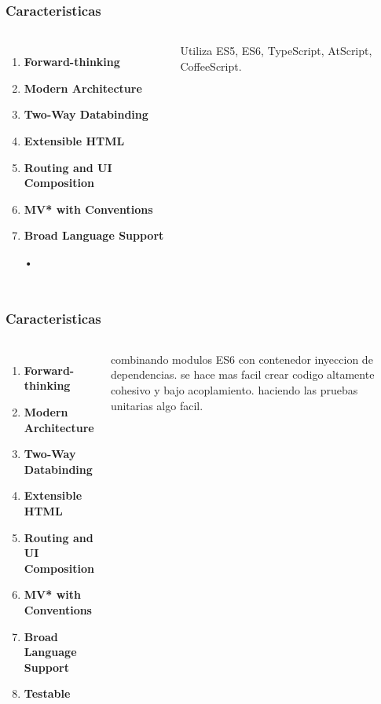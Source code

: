 \documentclass{beamer}
\begin{document}

\begin{frame}
\frametitle{Caracteristicas}
\begin{columns}[c] %

\begin{enumerate}
\item \textbf{Forward-thinking}
\item \textbf{Modern Architecture}
\item \textbf{Two-Way Databinding}
\item \textbf{Extensible HTML}
\item \textbf{Routing and UI Composition}
\item \textbf{MV* with Conventions}
\item \textbf{Broad Language Support}
\item[•]	
\end{enumerate}

Utiliza ES5, ES6, TypeScript, AtScript, CoffeeScript.
\end{columns}
\end{frame}


\begin{frame}
\frametitle{Caracteristicas}
\begin{columns}[c] %

\begin{enumerate}
\item \textbf{Forward-thinking}
\item \textbf{Modern Architecture}
\item \textbf{Two-Way Databinding}
\item \textbf{Extensible HTML}
\item \textbf{Routing and UI Composition}
\item \textbf{MV* with Conventions}
\item \textbf{Broad Language Support}
\item \textbf{Testable}
\end{enumerate}

combinando modulos ES6 con contenedor inyeccion de dependencias. se hace mas facil crear codigo altamente cohesivo y bajo acoplamiento. haciendo las pruebas unitarias algo facil.
\end{columns}
\end{frame}
\end{document}
